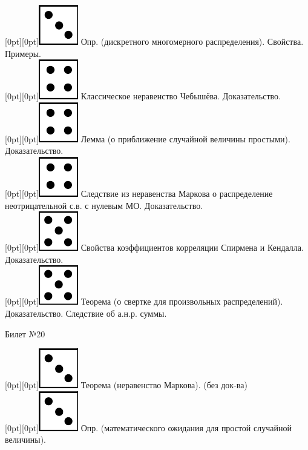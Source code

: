 \documentclass[10pt]{article}
\begin{document}
\raisebox{-1pt}[0pt][0pt]{\includegraphics[width=0.02\linewidth]{3.png}} Опр. (дискретного многомерного распределения). Свойства. Примеры. \\

\raisebox{-1pt}[0pt][0pt]{\includegraphics[width=0.02\linewidth]{4.png}} Классическое неравенство Чебышёва. Доказательство. \\

\raisebox{-1pt}[0pt][0pt]{\includegraphics[width=0.02\linewidth]{4.png}} Лемма (о приближение случайной величины простыми). Доказательство. \\

\raisebox{-1pt}[0pt][0pt]{\includegraphics[width=0.02\linewidth]{4.png}} Следствие из неравенства Маркова о распределение неотрицательной с.в. с нулевым МО. Доказательство. \\

\raisebox{-1pt}[0pt][0pt]{\includegraphics[width=0.02\linewidth]{5.png}} Свойства коэффициентов корреляции Спирмена и Кендалла. Доказательство. \\ 

\raisebox{-1pt}[0pt][0pt]{\includegraphics[width=0.02\linewidth]{5.png}} Теорема (о свертке для произвольных распределений). Доказательство. Следствие об а.н.р. суммы. \\ 

\begin{center} {\Large Билет №20} \end{center} 

\raisebox{-1pt}[0pt][0pt]{\includegraphics[width=0.02\linewidth]{3.png}} Теорема (неравенство Маркова). (без док-ва) \\

\raisebox{-1pt}[0pt][0pt]{\includegraphics[width=0.02\linewidth]{3.png}} Опр. (математического ожидания для простой случайной величины). \\
\end{document}
